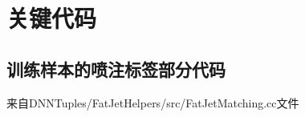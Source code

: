 \chapter{关键代码}
\section{训练样本的喷注标签部分代码}\label{appendix:labeling}
来自DNNTuples\cite{dnntuples}/FatJetHelpers/src/FatJetMatching.cc文件
\inputminted[linenos=true,tabsize=2,breaklines=true,bgcolor=bg,fontsize=\footnotesize,baselinestretch=1.2]{c++}{codes/FatJetMatching.cc}

